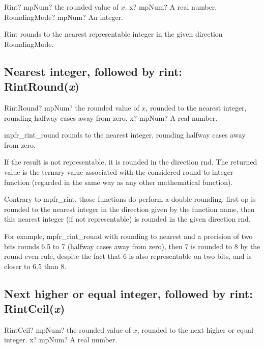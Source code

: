 \begin{mpFunctionsExtract}
	\mpFunctionOne
	{Rint? mpNum? the rounded value of $x$.}
	{x? mpNum? A real number.}
	{RoundingMode? mpNum? An integer.}
\end{mpFunctionsExtract}

\vspace{0.3cm}
Rint rounds to the nearest representable integer in the given direction RoundingMode.



\subsection{Nearest integer, followed by rint: RintRound(\textit{x})}

\begin{mpFunctionsExtract}
	\mpFunctionOne
	{RintRound? mpNum? the rounded value of $x$, rounded to the nearest integer, rounding halfway cases away from zero.}
	{x? mpNum? A real number.}
\end{mpFunctionsExtract}

\vspace{0.3cm}

mpfr\_rint\_round rounds to the nearest integer, rounding halfway cases away from zero.

If the result is not representable, it is rounded in the direction rnd. The
returned value is the ternary value associated with the considered round-to-integer function
(regarded in the same way as any other mathematical function). 

Contrary to mpfr\_rint, those functions do perform a double rounding: first op is rounded to the nearest integer in
the direction given by the function name, then this nearest integer (if not representable) is
rounded in the given direction rnd. 

For example, mpfr\_rint\_round with rounding to nearest
and a precision of two bits rounds 6.5 to 7 (halfway cases away from zero), then 7 is rounded
to 8 by the round-even rule, despite the fact that 6 is also representable on two bits, and is
closer to 6.5 than 8.


\subsection{Next higher or equal integer, followed by rint: RintCeil(\textit{x})}

\begin{mpFunctionsExtract}
	\mpFunctionOne
	{RintCeil? mpNum? the rounded value of $x$, rounded to the next higher or equal integer.}
	{x? mpNum? A real number.}
\end{mpFunctionsExtract}

